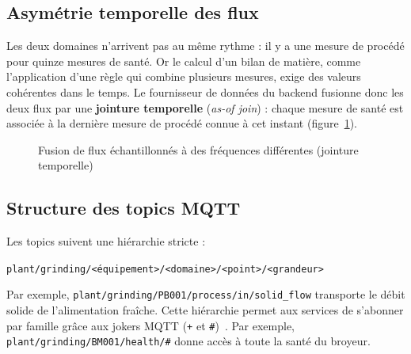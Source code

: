 \subsection{Asymétrie temporelle des flux}
\label{sec:asymetrie}
Les deux domaines n'arrivent pas au même rythme : il y a une mesure de procédé pour quinze mesures de santé. Or le calcul d'un bilan de matière, comme l'application d'une règle qui combine plusieurs mesures, exige des valeurs cohérentes dans le temps. Le fournisseur de données du backend fusionne donc les deux flux par une \textbf{jointure temporelle} (\textit{as-of join}) : chaque mesure de santé est associée à la dernière mesure de procédé connue à cet instant (figure~\ref{fig:asym}).

\begin{figure}[H]
\centering
{}
\caption{Fusion de flux échantillonnés à des fréquences différentes (jointure temporelle)}
\label{fig:asym}
\end{figure}

\subsection{Structure des topics MQTT}
Les topics suivent une hiérarchie stricte :
\begin{center}\texttt{plant/grinding/<équipement>/<domaine>/<point>/<grandeur>}\end{center}
Par exemple, \nolinkurl{plant/grinding/PB001/process/in/solid_flow} transporte le débit solide de l'alimentation fraîche. Cette hiérarchie permet aux services de s'abonner par famille grâce aux jokers MQTT (\texttt{+} et \texttt{\#})~\cite{mqtt5}. Par exemple, \nolinkurl{plant/grinding/BM001/health/#} donne accès à toute la santé du broyeur.

